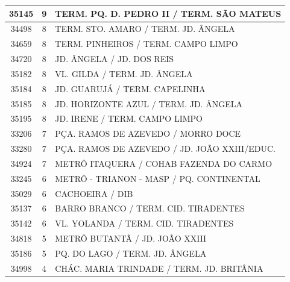\documentclass[
	12pt,				%
	oneside,			%
	a4paper,			%
	english,			%
	brazil				%
	]{abntex2ppgsi}
\begin{document}
\begin{apendicesenv}
\begin{longtable}{c|c|p{7cm}}
    35145 & 9     & TERM. PQ. D. PEDRO II / TERM. SÃO MATEUS \\
\hline

    34498 & 8     & TERM. STO. AMARO / TERM. JD. ÂNGELA \\
\hline

    34659 & 8     & TERM. PINHEIROS / TERM. CAMPO LIMPO \\
\hline

    34720 & 8     & JD. ÂNGELA / JD. DOS REIS \\
\hline

    35182 & 8     & VL. GILDA / TERM. JD. ÂNGELA \\
\hline

    35184 & 8     & JD. GUARUJÁ / TERM. CAPELINHA \\
\hline

    35185 & 8     & JD. HORIZONTE AZUL / TERM. JD. ÂNGELA \\
\hline

    35195 & 8     & JD. IRENE / TERM. CAMPO LIMPO \\
\hline

    33206 & 7     & PÇA. RAMOS DE AZEVEDO / MORRO DOCE \\
\hline

    33280 & 7     & PÇA. RAMOS DE AZEVEDO / JD. JOÃO XXIII/EDUC. \\
\hline

    34924 & 7     & METRÔ ITAQUERA / COHAB FAZENDA DO CARMO \\
\hline

    33245 & 6     & METRÔ - TRIANON - MASP  / PQ. CONTINENTAL \\
\hline

    35029 & 6     & CACHOEIRA / DIB \\
\hline

    35137 & 6     & BARRO BRANCO / TERM. CID. TIRADENTES \\
\hline

    35142 & 6     & VL. YOLANDA / TERM. CID. TIRADENTES \\
\hline

    34818 & 5     & METRÔ BUTANTÃ / JD. JOÃO XXIII \\
\hline

    35186 & 5     & PQ. DO LAGO / TERM. JD. ÂNGELA \\
\hline

    34998 & 4     & CHÁC. MARIA TRINDADE / TERM. JD. BRITÂNIA \\
\hline


\end{longtable}
\end{apendicesenv}
\end{document}
